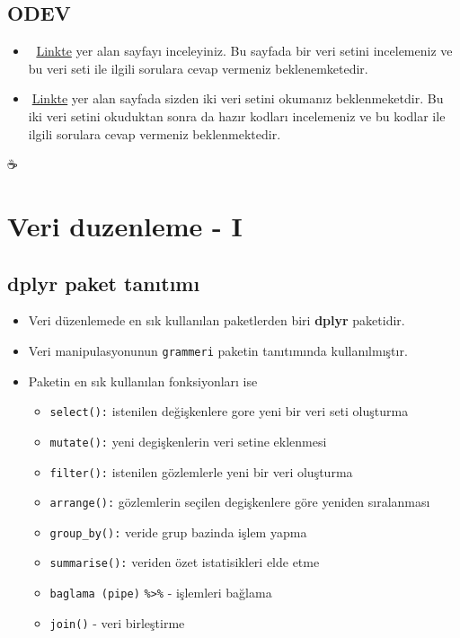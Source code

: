 \documentclass[
  oneside]{book}
\begin{document}
\hypertarget{odev-2}{%
\section{ODEV}\label{odev-2}}

\begin{itemize}
\item
  🔗 \href{https://psyteachr.github.io/data-skills-v1/getting-to-know-the-data.html}{Linkte} yer alan sayfayı inceleyiniz. Bu sayfada bir veri setini incelemeniz ve bu veri seti ile ilgili sorulara cevap vermeniz beklenemketedir.
\item
  🔗\href{https://psyteachr.github.io/data-skills-v1/loading-data.html}{Linkte} yer alan sayfada sizden iki veri setini okumanız beklenmeketdir. Bu iki veri setini okuduktan sonra da hazır kodları incelemeniz ve bu kodlar ile ilgili sorulara cevap vermeniz beklenmektedir.
\end{itemize}

☕

\hypertarget{veri-duzenleme---i}{%
\chapter{Veri duzenleme - I}\label{veri-duzenleme---i}}

\hypertarget{dplyr-paket-tanux131tux131mux131}{%
\section{dplyr paket tanıtımı}\label{dplyr-paket-tanux131tux131mux131}}

\begin{itemize}
\item
  Veri düzenlemede en sık kullanılan paketlerden biri \textbf{dplyr} paketidir.
\item
  Veri manipulasyonunun \texttt{grammeri} paketin tanıtımında kullanılmıştır.
\item
  Paketin en sık kullanılan fonksiyonları ise

  \begin{itemize}
  \item
    \texttt{select():} istenilen değişkenlere gore yeni bir veri seti oluşturma
  \item
    \texttt{mutate():} yeni degişkenlerin veri setine eklenmesi
  \item
    \texttt{filter():} istenilen gözlemlerle yeni bir veri oluşturma
  \item
    \texttt{arrange():} gözlemlerin seçilen degişkenlere göre yeniden sıralanması
  \item
    \texttt{group\_by():} veride grup bazinda işlem yapma
  \item
    \texttt{summarise():} veriden özet istatisikleri elde etme
  \item
    \texttt{baglama\ (pipe)} \texttt{\%\textgreater{}\%} - işlemleri bağlama
  \item
    \texttt{join()} - veri birleştirme
  \end{itemize}
\end{itemize}
\end{document}
